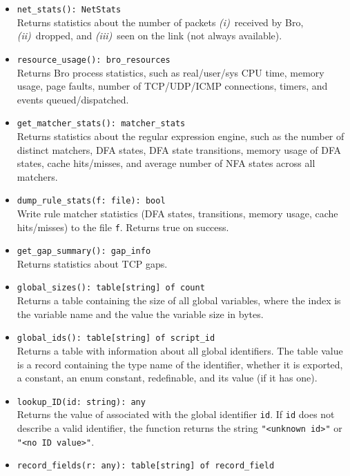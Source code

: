 \documentclass[10pt,landscape]{article}
\newcommand{\first}{\emph{(i)}~}
\newcommand{\second}{\emph{(ii)}~}
\newcommand{\third}{\emph{(iii)}~}
\newcommand{\ReturnsTrueOnSuccess}{Returns true on success.\xspace}
\begin{document}
\begin{multicols*}{2}
\begin{itemize}
    Returns true if Bro is in the process of shutting down.
  \item \verb|net_stats(): NetStats|\\
    Returns statistics about the number of packets
    \first received by Bro,
    \second dropped,
    and \third seen on the link (not always available).
  \item \verb|resource_usage(): bro_resources|\\
    Returns Bro process statistics, such as real/user/sys CPU time, memory
    usage, page faults, number of TCP/UDP/ICMP connections, timers, and events
    queued/dispatched.
  \item \verb|get_matcher_stats(): matcher_stats|\\
    Returns statistics about the regular expression engine, such as the number
    of distinct matchers, DFA states, DFA state transitions, memory usage of
    DFA states, cache hits/misses, and average number of NFA states across all
    matchers.
  \item \verb|dump_rule_stats(f: file): bool|\\
    Write rule matcher statistics (DFA states, transitions, memory usage, cache
    hits/misses) to the file \verb|f|.
    \ReturnsTrueOnSuccess
  \item \verb|get_gap_summary(): gap_info|\\
    Returns statistics about TCP gaps.
  \item \verb|global_sizes(): table[string] of count|\\
    Returns a table containing the size of all global variables, where the
    index is the variable name and the value the variable size in bytes.
  \item \verb|global_ids(): table[string] of script_id|\\
    Returns a table with information about all global identifiers. The table
    value is a record containing the type name of the identifier, whether it is
    exported, a constant, an enum constant, redefinable, and its value (if it
    has one).
  \item \verb|lookup_ID(id: string): any|\\
    Returns the value of associated with the global identifier \verb|id|. If
    \verb|id| does not describe a valid identifier, the function returns the
    string \verb|"<unknown id>"| or \verb|"<no ID value>"|.
  \item \verb|record_fields(r: any): table[string] of record_field|\\

\end{itemize}
\end{multicols*}
\end{document}
